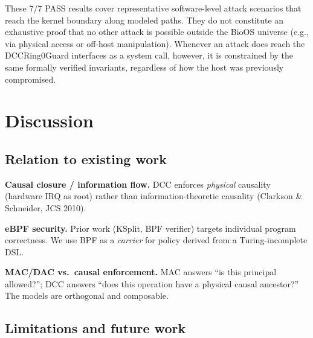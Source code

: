 \documentclass[11pt,a4paper,twoside]{article}
\begin{document}
\noindent These 7/7 PASS results cover representative software-level attack scenarios
that reach the kernel boundary along modeled paths. They do not constitute an
exhaustive proof that no other attack is possible outside the BioOS universe (e.g.,
via physical access or off-host manipulation). Whenever an attack does reach the
DCCRing0Guard interfaces as a system call, however, it is constrained by the same
formally verified invariants, regardless of how the host was previously compromised.

\section{Discussion}

\subsection{Relation to existing work}

\textbf{Causal closure / information flow.}
DCC enforces \emph{physical} causality (hardware IRQ as root) rather than
information-theoretic causality (Clarkson \& Schneider, JCS 2010).

\textbf{eBPF security.}
Prior work (KSplit, BPF verifier) targets individual program correctness.
We use BPF as a \emph{carrier} for policy derived from a Turing-incomplete DSL.

\textbf{MAC/DAC vs.\ causal enforcement.}
MAC answers ``is this principal allowed?''; DCC answers ``does this operation
have a physical causal ancestor?'' The models are orthogonal and composable.

\subsection{Limitations and future work}
\label{sec:limits}
\end{document}
